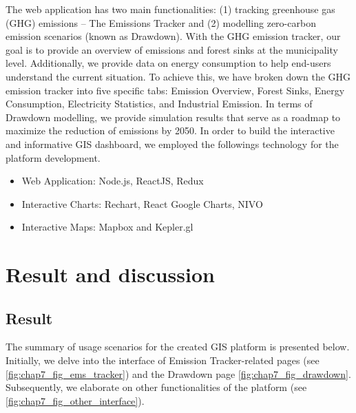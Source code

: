 The web application has two main functionalities: (1) tracking greenhouse gas (GHG) emissions – The Emissions Tracker and (2) modelling zero-carbon emission scenarios (known as Drawdown). With the GHG emission tracker, our goal is to provide an overview of emissions and forest sinks at the municipality level. Additionally, we provide data on energy consumption to help end-users understand the current situation. To achieve this, we have broken down the GHG emission tracker into five specific tabs: Emission Overview, Forest Sinks, Energy Consumption, Electricity Statistics, and Industrial Emission. In terms of Drawdown modelling, we provide simulation results that serve as a roadmap to maximize the reduction of emissions by 2050. In order to build the interactive and informative GIS dashboard, we employed the followings technology for the platform development. \par
\begin{itemize}
  \item Web Application: Node.js, ReactJS, Redux
  \item Interactive Charts: Rechart, React Google Charts, NIVO
  \item Interactive Maps: Mapbox and Kepler.gl
\end{itemize}

\section{Result and discussion}
\subsection{Result}
The summary of usage scenarios for the created GIS platform is presented below. Initially, we delve into the interface of Emission Tracker-related pages (see \ref{fig:chap7_fig_ems_tracker}) and the Drawdown page {\ref{fig:chap7_fig_drawdown}}. Subsequently, we elaborate on other functionalities of the platform (see \ref{fig:chap7_fig_other_interface}). \par

